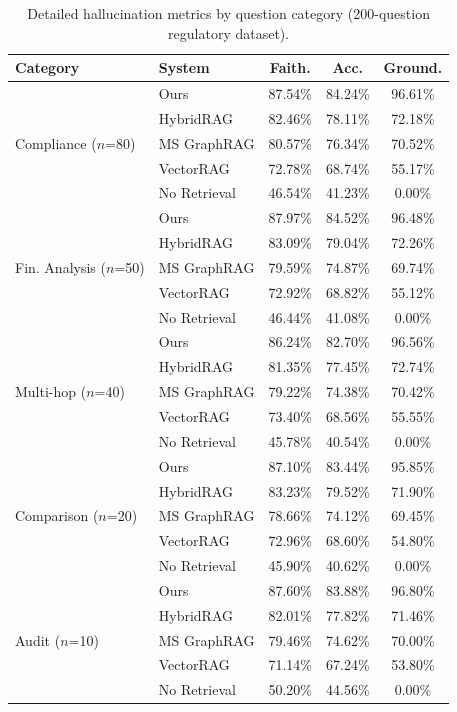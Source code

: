 \documentclass[review]{elsarticle}
\begin{document}
\begin{table}[ht]
\caption{Detailed hallucination metrics by question category (200-question regulatory dataset).}
\label{tab:detailed-hallucination}
\centering
\small
\begin{tabular}{@{}llccc@{}}
\toprule
\textbf{Category} & \textbf{System} & \textbf{Faith.} & \textbf{Acc.} & \textbf{Ground.} \\
\midrule
\multirow{5}{*}{Compliance ($n$=80)}
& Ours & 87.54\% & 84.24\% & 96.61\% \\
& HybridRAG & 82.46\% & 78.11\% & 72.18\% \\
& MS GraphRAG & 80.57\% & 76.34\% & 70.52\% \\
& VectorRAG & 72.78\% & 68.74\% & 55.17\% \\
& No Retrieval & 46.54\% & 41.23\% & 0.00\% \\
\midrule
\multirow{5}{*}{Fin. Analysis ($n$=50)}
& Ours & 87.97\% & 84.52\% & 96.48\% \\
& HybridRAG & 83.09\% & 79.04\% & 72.26\% \\
& MS GraphRAG & 79.59\% & 74.87\% & 69.74\% \\
& VectorRAG & 72.92\% & 68.82\% & 55.12\% \\
& No Retrieval & 46.44\% & 41.08\% & 0.00\% \\
\midrule
\multirow{5}{*}{Multi-hop ($n$=40)}
& Ours & 86.24\% & 82.70\% & 96.56\% \\
& HybridRAG & 81.35\% & 77.45\% & 72.74\% \\
& MS GraphRAG & 79.22\% & 74.38\% & 70.42\% \\
& VectorRAG & 73.40\% & 68.56\% & 55.55\% \\
& No Retrieval & 45.78\% & 40.54\% & 0.00\% \\
\midrule
\multirow{5}{*}{Comparison ($n$=20)}
& Ours & 87.10\% & 83.44\% & 95.85\% \\
& HybridRAG & 83.23\% & 79.52\% & 71.90\% \\
& MS GraphRAG & 78.66\% & 74.12\% & 69.45\% \\
& VectorRAG & 72.96\% & 68.60\% & 54.80\% \\
& No Retrieval & 45.90\% & 40.62\% & 0.00\% \\
\midrule
\multirow{5}{*}{Audit ($n$=10)}
& Ours & 87.60\% & 83.88\% & 96.80\% \\
& HybridRAG & 82.01\% & 77.82\% & 71.46\% \\
& MS GraphRAG & 79.46\% & 74.62\% & 70.00\% \\
& VectorRAG & 71.14\% & 67.24\% & 53.80\% \\
& No Retrieval & 50.20\% & 44.56\% & 0.00\% \\
\bottomrule
\end{tabular}
\end{table}
\end{document}
